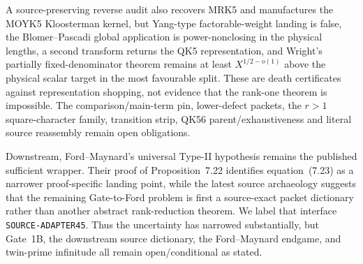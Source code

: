 \documentclass[11pt]{article}
\theoremstyle{definition}
\newcommand{\1}{\mathbf 1}
\begin{document}
A source-preserving reverse audit also recovers MRK5 and manufactures the
MOYK5 Kloosterman kernel, but Yang-type factorable-weight landing is false,
the Blomer--Pascadi global application is power-nonclosing in the physical
lengths, a second transform returns the QK5 representation, and Wright's
partially fixed-denominator theorem remains at least $X^{1/2-o(1)}$ above the
physical scalar target in the most favourable split.  These are death
certificates against representation shopping, not evidence that the
rank-one theorem is impossible.  The comparison/main-term pin, lower-defect
packets, the $r>1$ square-character family, transition strip, QK56
parent/exhaustiveness and literal source reassembly remain open obligations.

Downstream, Ford--Maynard's universal Type-II hypothesis remains the published
sufficient wrapper.  Their proof of Proposition~7.22 identifies equation~(7.23)
as a narrower proof-specific landing point, while the latest source archaeology
suggests that the remaining Gate-to-Ford problem is first a source-exact packet
dictionary rather than another abstract rank-reduction theorem.  We label that
interface \texttt{SOURCE-ADAPTER45}.  Thus the uncertainty has narrowed
substantially, but Gate~1B, the downstream source dictionary, the Ford--Maynard
endgame, and twin-prime infinitude all remain open/conditional as stated.


\appendix
\end{document}
